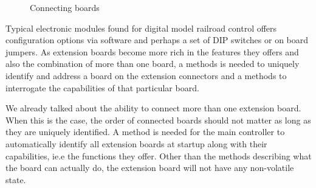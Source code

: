 \begin{figure}[htbp]
    \centering
    \caption{Connecting boards}
\end{figure}

Typical electronic modules found for digital model railroad control offers configuration options via software and perhaps a set of DIP switches or on board jumpers. As extension boards become more rich in the features they offers and also the combination of more than one board, a methods is needed to uniquely identify and address a board on the extension connectors and a methods to interrogate the capabilities of that particular board.

We already talked about the ability to connect more than one extension board. When this is the case, the order of connected boards should not matter as long as they are uniquely identified. A method is needed for the main controller to automatically identify all extension boards at startup along with their capabilities, ie.e the functions they offer. Other than the methods describing what the board can actually do, the extension board will not have any non-volatile state.


